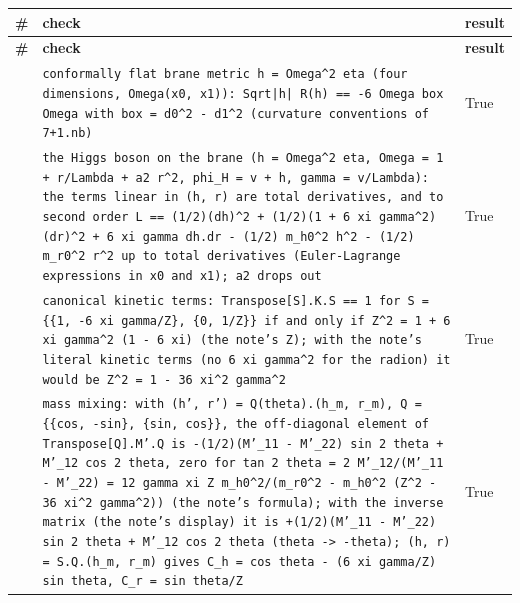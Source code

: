 \documentclass[10pt,a4paper]{article}
\begin{document}
{\footnotesize
\begin{longtable}{>{\raggedright\arraybackslash}p{}>{\raggedright\arraybackslash}p{}>{\raggedright\arraybackslash}p{}}
\toprule
\textbf{\#} & \textbf{check} & \textbf{result} \\
\midrule\endfirsthead
\toprule
\textbf{\#} & \textbf{check} & \textbf{result} \\
\midrule\endhead
\endfoot
\bottomrule\endlastfoot
475 & \texttt{conformally flat brane metric h = Omega\textasciicircum{}2 eta (four dimensions, Omega(x0, x1)): Sqrt|h| R(h) == -6 Omega box Omega with box = d0\textasciicircum{}2 - d1\textasciicircum{}2 (curvature conventions of 7+1.nb)} & True \\
476 & \texttt{the Higgs boson on the brane (h = Omega\textasciicircum{}2 eta, Omega = 1 + r/\allowbreak{}Lambda + a2 r\textasciicircum{}2, phi\_\allowbreak{}H = v + h, gamma = v/\allowbreak{}Lambda): the terms linear in (h, r) are total derivatives, and to second order L == (1/\allowbreak{}2)(dh)\textasciicircum{}2 + (1/\allowbreak{}2)(1 + 6 xi gamma\textasciicircum{}2)(dr)\textasciicircum{}2 + 6 xi gamma dh.dr - (1/\allowbreak{}2) m\_\allowbreak{}h0\textasciicircum{}2 h\textasciicircum{}2 - (1/\allowbreak{}2) m\_\allowbreak{}r0\textasciicircum{}2 r\textasciicircum{}2 up to total derivatives (Euler-Lagrange expressions in x0 and x1); a2 drops out} & True \\
477 & \texttt{canonical kinetic terms: Transpose[S].K.S == 1 for S = \{\{1, -6 xi gamma/\allowbreak{}Z\}, \{0, 1/\allowbreak{}Z\}\} if and only if Z\textasciicircum{}2 = 1 + 6 xi gamma\textasciicircum{}2 (1 - 6 xi) (the note's Z); with the note's literal kinetic terms (no 6 xi gamma\textasciicircum{}2 for the radion) it would be Z\textasciicircum{}2 = 1 - 36 xi\textasciicircum{}2 gamma\textasciicircum{}2} & True \\
478 & \texttt{mass mixing: with (h', r') = Q(theta).(h\_\allowbreak{}m, r\_\allowbreak{}m), Q = \{\{cos, -sin\}, \{sin, cos\}\}, the off-diagonal element of Transpose[Q].M'.Q is -(1/\allowbreak{}2)(M'\_\allowbreak{}11 - M'\_\allowbreak{}22) sin 2 theta + M'\_\allowbreak{}12 cos 2 theta, zero for tan 2 theta = 2 M'\_\allowbreak{}12/\allowbreak{}(M'\_\allowbreak{}11 - M'\_\allowbreak{}22) = 12 gamma xi Z m\_\allowbreak{}h0\textasciicircum{}2/\allowbreak{}(m\_\allowbreak{}r0\textasciicircum{}2 - m\_\allowbreak{}h0\textasciicircum{}2 (Z\textasciicircum{}2 - 36 xi\textasciicircum{}2 gamma\textasciicircum{}2)) (the note's formula); with the inverse matrix (the note's display) it is +(1/\allowbreak{}2)(M'\_\allowbreak{}11 - M'\_\allowbreak{}22) sin 2 theta + M'\_\allowbreak{}12 cos 2 theta (theta -> -theta); (h, r) = S.Q.(h\_\allowbreak{}m, r\_\allowbreak{}m) gives C\_\allowbreak{}h = cos theta - (6 xi gamma/\allowbreak{}Z) sin theta, C\_\allowbreak{}r = sin theta/\allowbreak{}Z} & True \\

\end{longtable}}
\end{document}
